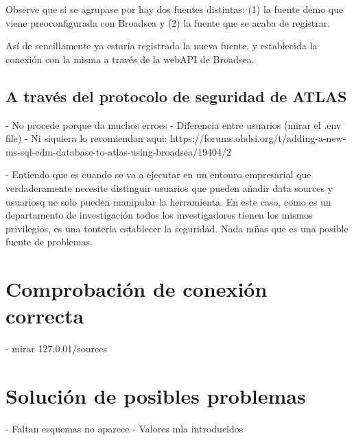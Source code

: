 \begin{enumerate}
    Observe que si se agrupase por  hay dos fuentes distintas: (1) la fuente demo que viene preoconfigurada con Broadsea y (2) la fuente que se acaba de registrar.

\end{enumerate}

Así de sencillamente ya estaría registrada la nueva fuente, y establecida la conexión con la misma a través de la webAPI de Broadsea.


\subsection{A través del protocolo de seguridad de ATLAS}

- No procede porque da muchos erroes
- Diferencia entre usuarios (mirar el .env file)
- Ni siquiera lo recomiendan aqui: https://forums.ohdsi.org/t/adding-a-new-ms-sql-cdm-database-to-atlas-using-broadsea/19404/2 

- Entiendo que es cuando se va a ejecutar en un entonro empresarial que verdaderamente necesite distinguir usuarios que pueden añadir data sources y usuariosq ue solo pueden manipular la herramienta. En este caso, como es un departamento de investigación todos los investigadores tienen los mismos privilegios, es una tonteria establecer la seguridad. Nada mñas que es una posible fuente de problemas.

\section{Comprobación de conexión correcta}

- mirar 127.0.01/sources


\section{Solución de posibles problemas}

- Faltan esquemas no aparece
- Valores mla introducidos
